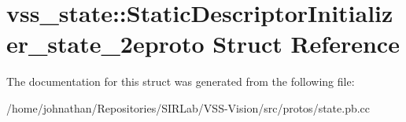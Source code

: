 \hypertarget{structvss__state_1_1StaticDescriptorInitializer__state__2eproto}{}\section{vss\+\_\+state\+:\+:Static\+Descriptor\+Initializer\+\_\+state\+\_\+2eproto Struct Reference}
\label{structvss__state_1_1StaticDescriptorInitializer__state__2eproto}


The documentation for this struct was generated from the following file\+:\begin{DoxyCompactItemize}
\item 
/home/johnathan/\+Repositories/\+S\+I\+R\+Lab/\+V\+S\+S-\/\+Vision/src/protos/state.\+pb.\+cc\end{DoxyCompactItemize}
